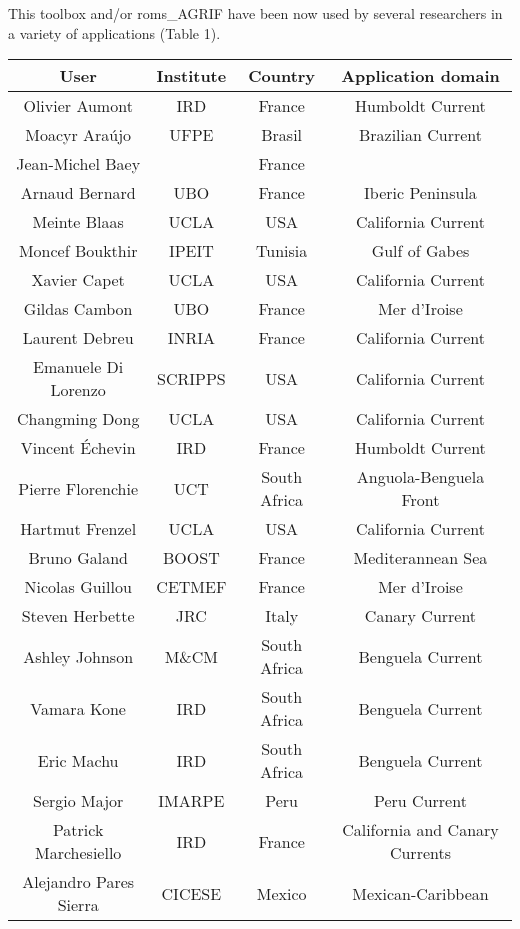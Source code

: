 
This toolbox and/or roms\_AGRIF have been now used by several researchers
in a variety of applications (Table 1).

\begin{table}[!ht]
\begin{center}
\begin{tabular}{|c|c|c|c|}
\hline
User & Institute & Country & Application domain \\
\hline
\hline
Olivier Aumont & IRD & France & Humboldt Current \\
Moacyr Ara\'ujo & UFPE & Brasil & Brazilian Current \\
Jean-Michel Baey &  & France &  \\
Arnaud Bernard & UBO & France & Iberic Peninsula \\
Meinte Blaas  & UCLA & USA & California Current \\
Moncef Boukthir & IPEIT & Tunisia & Gulf of Gabes \\ 
Xavier Capet & UCLA & USA & California Current \\
Gildas Cambon & UBO & France & Mer d'Iroise \\
Laurent Debreu & INRIA & France & California Current \\
Emanuele Di Lorenzo & SCRIPPS & USA & California Current \\
Changming Dong  & UCLA & USA & California Current \\
Vincent \'Echevin & IRD & France & Humboldt Current \\
Pierre Florenchie & UCT & South Africa & Anguola-Benguela Front \\
Hartmut Frenzel &  UCLA & USA & California Current  \\
Bruno Galand & BOOST & France & Mediterannean Sea \\
Nicolas Guillou & CETMEF & France & Mer d'Iroise \\
Steven Herbette & JRC & Italy & Canary Current \\
Ashley Johnson & M\&CM & South Africa & Benguela Current \\
Vamara Kone   & IRD & South Africa & Benguela Current \\
Eric Machu  & IRD & South Africa & Benguela Current \\
Sergio Major & IMARPE & Peru & Peru Current \\
Patrick Marchesiello & IRD & France & California and Canary Currents \\
Alejandro Pares Sierra & CICESE & Mexico & Mexican-Caribbean \\

\end{tabular}
\end{center}
\end{table}
